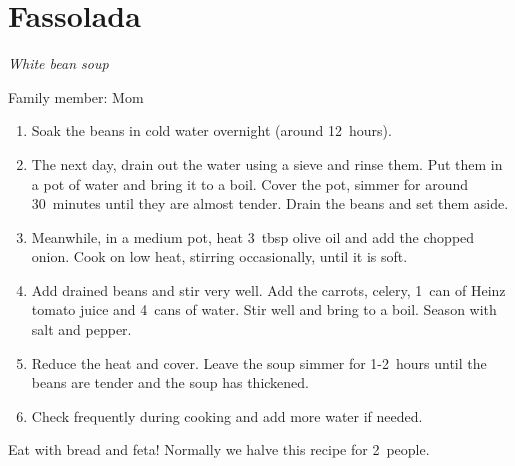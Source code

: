 \chapter{Fassolada}
\label{ch:fassolada}


\textit{White bean soup}

Family member: Mom

\begin{enumerate}
    \item Soak the beans in cold water overnight (around 12~hours).
    \item The next day, drain out the water using a sieve and rinse them. Put them in a pot of water and bring it to a boil. Cover the pot, simmer for around 30~minutes until they are almost tender. Drain the beans and set them aside.
    \item Meanwhile, in a medium pot, heat 3~tbsp olive oil and add the chopped onion. Cook on low heat, stirring occasionally, until it is soft.
    \item Add drained beans and stir very well. Add the carrots, celery, 1~can of Heinz tomato juice and 4~cans of water. Stir well and bring to a boil. Season with salt and pepper.
    \item Reduce the heat and cover. Leave the soup simmer for 1-2~hours until the beans are tender and the soup has thickened.
    \item Check frequently during cooking and add more water if needed.
\end{enumerate}

Eat with bread and feta! Normally we halve this recipe for 2~people.
